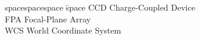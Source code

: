 \begin{tabbing}
spacespacespace \= space \kill
CCD     \> 	Charge-Coupled Device	 \\
FPA     \> 	Focal-Plane Array	 \\
WCS     \>  World Coordinate System  \\
\end{tabbing}
\endinput
